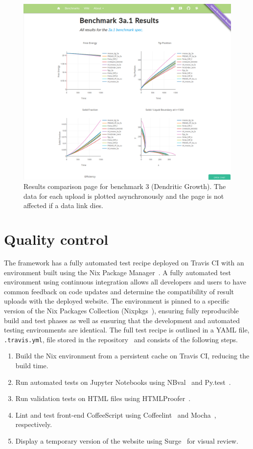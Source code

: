 \documentclass{jors}
\begin{document}
\begin{figure}
  \includegraphics[width=\textwidth]{pfhub_results.png}
  \caption{Results comparison page for benchmark 3 (Dendritic
    Growth). The data for each upload is plotted asynchronously and the
    page is not affected if a data link dies.}  \centering
  \label{fig:pfhub_results}
\end{figure}


\section*{Quality control}

The framework has a fully automated test recipe deployed on Travis CI
with an environment built using the Nix Package Manager~\cite{nix}. A
fully automated test environment using continuous integration allows
all developers and users to have common feedback on code updates and
determine the compatibility of result uploads with the deployed
website. The environment is pinned to a specific version of the Nix
Packages Collection (Nixpkgs~\cite{nixpkgs}), ensuring fully
reproducible build and test phases as well as ensuring that the
development and automated testing environments are identical. The full
test recipe is outlined in a YAML file, \texttt{.travis.yml}, file
stored in the repository~\cite{travisyml} and consists of the
following steps.

\begin{enumerate}
  \item Build the Nix environment from a persistent cache on Travis
    CI, reducing the build time.
  \item Run automated tests on Jupyter Notebooks using
    NBval~\cite{nbval} and Py.test~\cite{pytest}.
  \item Run validation tests on HTML files using
    HTMLProofer~\cite{htmlproofer}.
  \item Lint and test front-end CoffeeScript using
    Coffeelint~\cite{coffeelint} and Mocha~\cite{mocha}, respectively.
  \item Display a temporary version of the website using
    Surge~\cite{surge} for visual review.
\end{enumerate}
\end{document}
